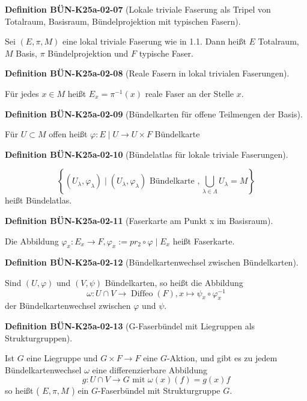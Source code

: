 \documentclass[10pt, letterpaper]{article}
\newcommand{\CustomHeading}[3]{%
  \par\medskip\noindent%
  \textbf{#1 #2} \textnormal{(#3)}.\enskip%
}
\newenvironment{DEF}[2]{\begin{unitbox}\CustomHeading{Definition}{#1}{#2}}{\end{unitbox}}
\begin{document}
\begin{DEF}{BÜN-K25a-02-07}{Lokale triviale Faserung als Tripel von Totalraum, Basisraum, Bündelprojektion mit typischen Fasern}
Sei $(E, \pi, M)$ eine lokal triviale Faserung wie in 1.1. Dann heißt $E$ Totalraum, $M$ Basis, $\pi$ Bündelprojektion und $F$ typische Faser.
\end{DEF}

\begin{DEF}{BÜN-K25a-02-08}{Reale Fasern in lokal trivialen Faserungen}
Für jedes $x \in M$ heißt $E_{x}=\pi^{-1}(x)$ reale Faser an der Stelle $x$.
\end{DEF}

\begin{DEF}{BÜN-K25a-02-09}{Bündelkarten für offene Teilmengen der Basis}
Für $U \subset M$ offen heißt $\varphi: E \mid U \rightarrow U \times F$ Bündelkarte
\end{DEF}


\begin{DEF}{BÜN-K25a-02-10}{Bündelatlas für lokale triviale Faserungen}
$$
\left\{\left(U_{\lambda}, \varphi_{\lambda}\right) \mid\left(U_{\lambda}, \varphi_{\lambda}\right) \text { Bündelkarte }, \bigcup_{\lambda \in \Lambda} U_{\lambda}=M\right\}
$$
heißt Bündelatlas.
\end{DEF}


\begin{DEF}{BÜN-K25a-02-11}{Faserkarte am Punkt x im Basisraum}
Die Abbildung $\varphi_{x}: E_{x} \rightarrow F, \varphi_{x}:=p r_{2} \circ \varphi \mid E_{x}$ heißt Faserkarte.
\end{DEF}

\begin{DEF}{BÜN-K25a-02-12}{Bündelkartenwechsel zwischen Bündelkarten}
Sind $(U, \varphi)$ und $(V, \psi)$ Bündelkarten, so heißt die Abbildung
$$
\omega: U \cap V \rightarrow \operatorname{Diffeo}(F), x \mapsto \psi_{x} \circ \varphi_{x}^{-1}
$$
der Bündelkartenwechsel zwischen $\varphi$ und $\psi$.
\end{DEF}


\begin{DEF}{BÜN-K25a-02-13}{G-Faserbündel mit Liegruppen als Strukturgruppen}
Ist $G$ eine Liegruppe und $G \times F \rightarrow F$ eine $G$-Aktion, und gibt es zu jedem Bündelkartenwechsel $\omega$ eine differenzierbare Abbildung
$$
g: U \cap V \rightarrow G \text { mit } \omega(x)(f)=g(x) f
$$
so heißt ( $E, \pi, M$ ) ein $G$-Faserbündel mit Strukturgruppe $G$.
\end{DEF}
\end{document}

